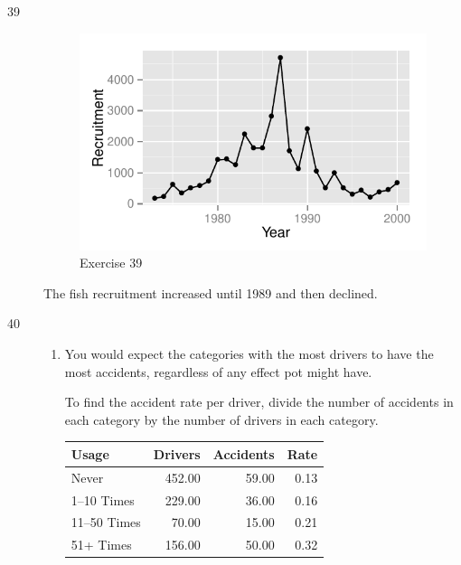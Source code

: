 \documentclass[letterpaper, landscape]{exam}
\begin{document}
\begin{description}

      \item[39]
        \begin{figure}[H]
          \centering
          \includegraphics{figures/ex39.pdf}
          \caption{Exercise 39}
        \end{figure}

        The fish recruitment increased until 1989 and then declined.

      \newpage

      \item[40]
        \begin{enumerate}[{a}]
          \item You would expect the categories with the most drivers to have
          the most accidents, regardless of any effect pot might have.  

          To find the accident rate per driver, divide the number of accidents in each
          category by the number of drivers in each category.

          \begin{table}[H]
            \centering
            \begin{tabular}{lrrr}
              \toprule
              Usage        & Drivers & Accidents & Rate \\
              \midrule
              Never        & 452.00  & 59.00     & 0.13 \\
              1--10 Times  & 229.00  & 36.00     & 0.16 \\
              11--50 Times & 70.00   & 15.00     & 0.21 \\
              51+ Times    & 156.00  & 50.00     & 0.32 \\
              \bottomrule
            \end{tabular}
          \end{table}


\end{enumerate}
\end{description}
\end{document}
